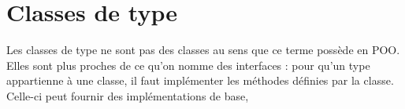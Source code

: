 \section[typeclasses]{ Classes de type}

Les classes de type ne sont pas des classes au sens que ce terme possède en POO.
Elles sont plus proches de ce qu'on nomme des interfaces : pour qu'un type
appartienne à une classe, il faut implémenter les méthodes définies par la classe.
Celle-ci peut fournir des implémentations de base,
